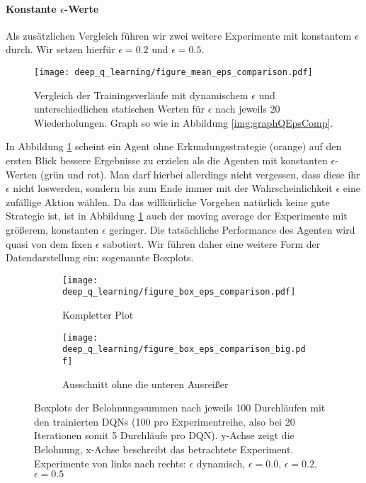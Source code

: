 \paragraph{Konstante $ \epsilon $-Werte}
Als zusätzlichen Vergleich führen wir zwei weitere Experimente mit konstantem $ \epsilon $ durch. Wir setzen hierfür $ \epsilon = 0.2 $ und $ \epsilon = 0.5 $.
\begin{figure}[h]
    \centering
    \texttt{[image: deep\_q\_learning/figure\_mean\_eps\_comparison.pdf]}
    \caption{Vergleich der Trainingsverläufe mit dynamischem $ \epsilon $ und unterschiedlichen statischen Werten für $ \epsilon $ nach jeweils 20 Wiederholungen. Graph so wie in Abbildung \ref{img:graphQEpsComp}.} \label{img:graphEpsComparison}
\end{figure}

In Abbildung \ref{img:graphEpsComparison} scheint ein Agent ohne Erkundungsstrategie (orange) auf den ersten Blick bessere Ergebnisse zu erzielen als die Agenten mit konstanten $ \epsilon $-Werten (grün und rot). Man darf hierbei allerdings nicht vergessen, dass diese ihr $ \epsilon $ nicht \glqq loswerden\grqq{}, sondern bis zum Ende immer mit der Wahrscheinlichkeit $ \epsilon $ eine zufällige Aktion wählen. Da das willkürliche Vorgehen natürlich keine gute Strategie ist, ist in Abbildung \ref{img:graphEpsComparison} auch der moving average der Experimente mit größerem, konstanten $ \epsilon $ geringer. Die tatsächliche Performance des Agenten wird quasi von dem fixen $ \epsilon $ sabotiert. Wir führen daher eine weitere Form der Datendarstellung ein: sogenannte Boxplots.
\begin{figure}[h!]
    \centering
    \begin{subfigure}[b]{0.7\textwidth}
        \texttt{[image: deep\_q\_learning/figure\_box\_eps\_comparison.pdf]}
        \caption{Kompletter Plot}
        \label{img:graphBoxEpsComparison}
    \end{subfigure}
    \begin{subfigure}[b]{0.7\textwidth}
        \texttt{[image: deep\_q\_learning/figure\_box\_eps\_comparison\_big.pdf]}
        \caption{Ausschnitt ohne die unteren Ausreißer}
        \label{img:graphBoxEpsComparisonBig}
    \end{subfigure}
    \caption{Boxplots der Belohnungssummen nach jeweils 100 Durchläufen mit den trainierten DQNs (100 pro Experimentreihe, also bei 20 Iterationen somit 5 Durchläufe pro DQN). y-Achse zeigt die Belohnung, x-Achse beschreibt das betrachtete Experiment. Experimente von links nach rechts: $ \epsilon $ dynamisch, $ \epsilon = 0.0 $, $ \epsilon = 0.2 $, $ \epsilon = 0.5 $}
    \label{img:graphBoxEpsComparisonBoth}
\end{figure}

